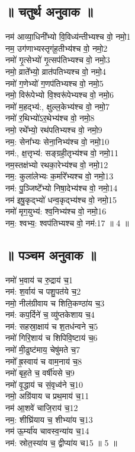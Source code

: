 \subsection{॥ चतुर्थ अनुवाक ॥}
नम॑ आव्या॒धिनी᳚भ्यो वि॒विध्य॑न्तीभ्यश्च वो॒ नमो॒{\small 1}\\
नम॒ उग॑णाभ्यस्तृग्ंह॒तीभ्य॑श्च वो॒ नमो॒{\small 2}\\
नमो॑ गृ॒त्सेभ्यो॑ गृ॒त्सप॑तिभ्यश्च वो॒ नमो॒{\small 3}\\
नमो॒ व्राते᳚भ्यो॒ व्रात॑पतिभ्यश्च वो॒ नमो॒{\small 4}\\
नमो॑ ग॒णेभ्यो॑ ग॒णप॑तिभ्यश्च वो॒ नमो॒{\small 5}\\
नमो॒ विरू॑पेभ्यो वि॒श्वरू॑पेभ्यश्च वो॒ नमो॒{\small 6}\\
नमो॑ म॒हद्भ्य॑:, क्षुल्ल॒केभ्य॑श्च वो॒ नमो॒{\small 7}\\
नमो॑ र॒थिभ्यो॑ऽर॒थेभ्य॑श्च वो॒ नमो॒{\small 8}\\
नमो॒ रथे᳚भ्यो॒ रथ॑पतिभ्यश्च वो॒ नमो॒{\small 9}\\
नम॒: सेना᳚भ्यः सेना॒निभ्य॑श्च वो॒ नमो॒{\small 10}\\
नम॑:, क्ष॒त्तृभ्य॑: सङ्ग्रही॒तृभ्य॑श्च वो॒ नमो॒{\small 11}\\
नम॒स्तक्ष॑भ्यो रथका॒रेभ्य॑श्च वो॒ नमो॒{\small 12}\\
नम॒: कुला॑लेभ्यः क॒र्मारे᳚भ्यश्च वो॒ नमो॒{\small 13}\\
नम॑: पु॒ञ्जिष्टे᳚भ्यो निषा॒देभ्य॑श्च वो॒ नमो॒{\small 14}\\
नम॑ इषु॒कृद्भ्यो॑ धन्व॒कृद्भ्य॑श्च वो॒ नमो॒{\small 15}\\
नमो॑ मृग॒युभ्य॑: श्व॒निभ्य॑श्च वो॒ नमो॒{\small 16}\\
नम॒: श्वभ्य॒: श्वप॑तिभ्यश्च वो॒ नम॑:{\small 17} ॥ 4 ॥\\
\subsection{॥ पञ्चम अनुवाक ॥}
नमो॑ भ॒वाय॑ च रु॒द्राय॑ च॒{\small 1} \\
नम॑: श॒र्वाय॑ च पशु॒पत॑ये च॒{\small 2}\\
नमो॒ नील॑ग्रीवाय च शिति॒कण्ठा॑य च॒{\small 3}\\
नम॑: कप॒र्दिने॑ च॒ व्यु॑प्तकेशाय च॒{\small 4}\\
नम॑: सहस्रा॒क्षाय॑ च श॒तध॑न्वने च॒{\small 5}\\
नमो॑ गिरि॒शाय॑ च शिपिवि॒ष्टाय॑ च॒{\small 6}\\
नमो॑ मी॒ढुष्ट॑माय॒ चेषु॑मते च॒{\small 7}\\
नमो᳚ ह्र॒स्वाय॑ च वाम॒नाय॑ च॒{\small 8}\\
नमो॑ बृह॒ते च॒ वर्षी॑यसे च॒{\small 9}\\
नमो॑ वृ॒द्धाय॑ च सं॒वृध्व॑ने च॒{\small 10}\\
नमो॒ अग्रि॑याय च प्रथ॒माय॑ च॒{\small 11}\\
नम॑ आ॒शवे॑ चाजि॒राय॑ च॒{\small 12}\\
नम॒: शीघ्रि॑याय च॒ शीभ्या॑य च॒{\small 13}\\
नम॑ ऊ॒र्म्या॑य चावस्व॒न्या॑य च॒{\small 14}\\
नम॑: स्रोत॒स्या॑य च॒ द्वीप्या॑य च{\small 15} ॥ 5 ॥\\
